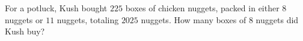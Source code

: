 For a potluck, Kush bought $225$ boxes of chicken nuggets, packed in either $8$ nuggets or $11$ nuggets, totaling $2025$ nuggets. How many boxes of $8$ nuggets did Kush buy?
